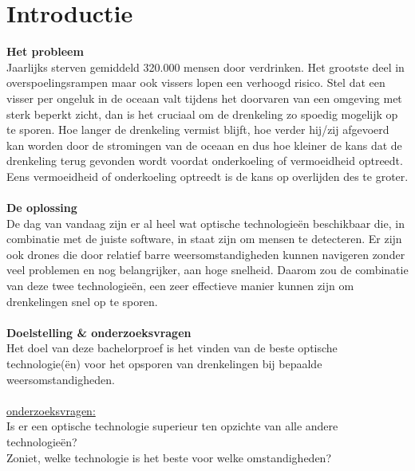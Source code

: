 
\section{Introductie} %
\label{sec:introductie}

\textbf{Het probleem}\\
Jaarlijks sterven gemiddeld 320.000 mensen door verdrinken. Het grootste deel in overspoelingsrampen maar ook vissers lopen een verhoogd risico. Stel dat een visser per ongeluk in de oceaan valt tijdens het doorvaren van een omgeving met sterk beperkt zicht, dan is het cruciaal om de drenkeling zo spoedig mogelijk op te sporen. Hoe langer de drenkeling vermist blijft, hoe verder hij/zij afgevoerd kan worden door de stromingen van de oceaan en dus hoe kleiner de kans dat de drenkeling terug gevonden wordt voordat onderkoeling of vermoeidheid optreedt. Eens vermoeidheid of onderkoeling optreedt is de kans op overlijden des te groter.\\\\
\textbf{De oplossing}\\
De dag van vandaag zijn er al heel wat optische technologieën beschikbaar die, in combinatie met de juiste software, in staat zijn om mensen te detecteren. Er zijn ook drones die door relatief barre weersomstandigheden kunnen navigeren zonder veel problemen en nog belangrijker, aan hoge snelheid. Daarom zou de combinatie van deze twee technologieën, een zeer effectieve manier kunnen zijn om drenkelingen snel op te sporen.\\\\
\textbf{Doelstelling \& onderzoeksvragen}\\
Het doel van deze bachelorproef is het vinden van de beste optische technologie(ën) voor het opsporen van drenkelingen bij bepaalde weersomstandigheden.\\\\
\underline{onderzoeksvragen:}\\
Is er een optische technologie superieur ten opzichte van alle andere technologieën?\\ Zoniet, welke technologie is het beste voor welke omstandigheden?


